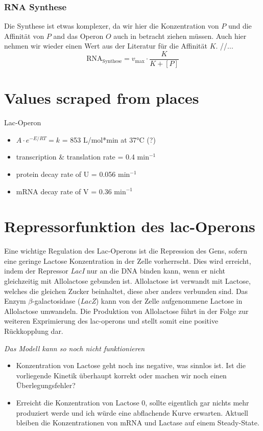 \documentclass{article}
\begin{document}
\subsubsection{RNA Synthese}
Die Synthese ist etwas komplexer, da wir hier die Konzentration von $P$ und die Affinität von $P$ and das Operon $O$ auch in betracht ziehen müssen. Auch hier nehmen wir wieder einen Wert aus der Literatur\cite{lacoperon} für die Affinität $K$. //...
\begin{equation} \label{eq:3}
    \text{RNA}_{\text{Synthese}}=v_{\text{max}} \cdot \frac{K}{K+[P]}
\end{equation}

\newpage
\section{Values scraped from places}
Lac-Operon\cite{lacoperon}
\begin{itemize}
    \item $A \cdot e^{-E/RT} = k$ = 853 L/mol*min at 37°C (?)
    \item transcription \& translation rate = 0.4 min$^{-1}$
    \item protein decay rate of U = 0.056 min$^{-1}$
    \item mRNA decay rate of V = 0.36 min$^{-1}$
\end{itemize}

\section*{Repressorfunktion des lac-Operons}

Eine wichtige Regulation des Lac-Operons ist die Repression des Gens, sofern eine geringe Lactose Konzentration in der Zelle vorherrscht. Dies wird erreicht, indem der Repressor \emph{LacI} nur an die DNA binden kann, wenn er nicht gleichzeitig mit Allolactose gebunden ist. Allolactose ist verwandt mit Lactose, welches die gleichen Zucker beinhaltet, diese aber anders verbunden sind. Das Enzym $\beta$-galactosidase (\emph{LacZ}) kann von der Zelle aufgenommene Lactose in Allolactose umwandeln. Die Produktion von Allolactose führt in der Folge zur weiteren Exprimierung des lac-operons und stellt somit eine positive Rückkopplung dar.
\par

\emph{Das Modell kann so noch nicht funktionieren}
\begin{itemize}
    \item Konzentration von Lactose geht noch ins negative, was sinnlos ist. Ist die vorliegende Kinetik überhaupt korrekt oder machen wir noch einen Überlegungsfehler?
    \item Erreicht die Konzentration von Lactose 0, sollte eigentlich gar nichts mehr produziert werde und ich würde eine abflachende Kurve erwarten. Aktuell bleiben die Konzentrationen von mRNA und Lactase auf einem Steady-State.
\end{itemize}
\end{document}
